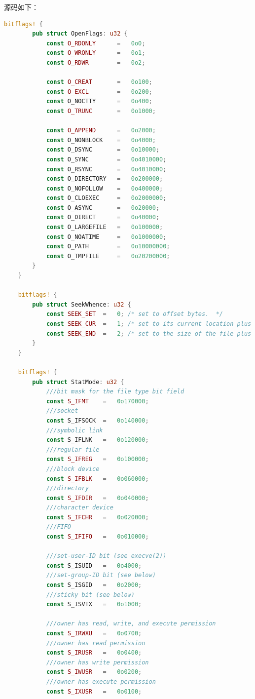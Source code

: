 源码如下：
\begin{lstlisting}[language={rust}, label={code:refill}, caption={FileDescriptor}]
    bitflags! {
        pub struct OpenFlags: u32 {
            const O_RDONLY      =   0o0;
            const O_WRONLY      =   0o1;
            const O_RDWR        =   0o2;

            const O_CREAT       =   0o100;
            const O_EXCL        =   0o200;
            const O_NOCTTY      =   0o400;
            const O_TRUNC       =   0o1000;

            const O_APPEND      =   0o2000;
            const O_NONBLOCK    =   0o4000;
            const O_DSYNC       =   0o10000;
            const O_SYNC        =   0o4010000;
            const O_RSYNC       =   0o4010000;
            const O_DIRECTORY   =   0o200000;
            const O_NOFOLLOW    =   0o400000;
            const O_CLOEXEC     =   0o2000000;
            const O_ASYNC       =   0o20000;
            const O_DIRECT      =   0o40000;
            const O_LARGEFILE   =   0o100000;
            const O_NOATIME     =   0o1000000;
            const O_PATH        =   0o10000000;
            const O_TMPFILE     =   0o20200000;
        }
    }

    bitflags! {
        pub struct SeekWhence: u32 {
            const SEEK_SET  =   0; /* set to offset bytes.  */
            const SEEK_CUR  =   1; /* set to its current location plus offset bytes.  */
            const SEEK_END  =   2; /* set to the size of the file plus offset bytes.  */
        }
    }

    bitflags! {
        pub struct StatMode: u32 {
            ///bit mask for the file type bit field
            const S_IFMT    =   0o170000;
            ///socket
            const S_IFSOCK  =   0o140000;
            ///symbolic link
            const S_IFLNK   =   0o120000;
            ///regular file
            const S_IFREG   =   0o100000;
            ///block device
            const S_IFBLK   =   0o060000;
            ///directory
            const S_IFDIR   =   0o040000;
            ///character device
            const S_IFCHR   =   0o020000;
            ///FIFO
            const S_IFIFO   =   0o010000;

            ///set-user-ID bit (see execve(2))
            const S_ISUID   =   0o4000;
            ///set-group-ID bit (see below)
            const S_ISGID   =   0o2000;
            ///sticky bit (see below)
            const S_ISVTX   =   0o1000;

            ///owner has read, write, and execute permission
            const S_IRWXU   =   0o0700;
            ///owner has read permission
            const S_IRUSR   =   0o0400;
            ///owner has write permission
            const S_IWUSR   =   0o0200;
            ///owner has execute permission
            const S_IXUSR   =   0o0100;


\end{lstlisting}
